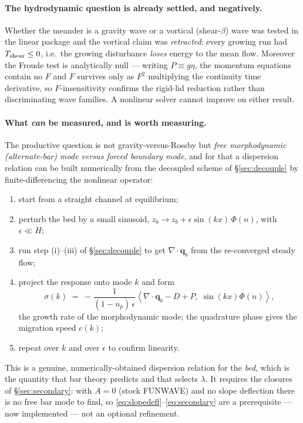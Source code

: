 \documentclass[11pt,a4paper]{article}
\begin{document}
\paragraph{The hydrodynamic question is already settled, and negatively.} Whether the
meander is a gravity wave or a vortical (shear-$\beta$) wave was tested in the linear
package and the vortical claim was \emph{retracted}: every growing run had
$T_{\rm shear}\le0$, i.e.\ the growing disturbance \emph{loses} energy to the mean flow.
Moreover the Froude test is analytically null --- writing $P\equiv g\eta$, the momentum
equations contain no $F$ and $F$ survives only as $F^2$ multiplying the continuity time
derivative, so $F$-insensitivity confirms the rigid-lid reduction rather than
discriminating wave families. A nonlinear solver cannot improve on either result.

\paragraph{What \emph{can} be measured, and is worth measuring.} The productive question
is not gravity-versus-Rossby but \emph{free morphodynamic (alternate-bar) mode versus
forced boundary mode}, and for that a dispersion relation can be built numerically from
the decoupled scheme of \S\ref{sec:decouple} by finite-differencing the nonlinear operator:
\begin{enumerate}\itemsep1pt
  \item start from a straight channel at equilibrium;
  \item perturb the bed by a small sinusoid,
        $z_b\to z_b+\epsilon\sin(kx)\,\Phi(n)$, with $\epsilon\ll H$;
  \item run step (i)--(iii) of \S\ref{sec:decouple} to get $\nabla\!\cdot\!\bm q_b$ from
        the re-converged steady flow;
  \item project the response onto mode $k$ and form
        \begin{equation}
          \sigma(k) \;=\; -\frac{1}{(1-n_p)\,\epsilon}
          \left\langle \nabla\!\cdot\!\bm q_b - D + P,\; \sin(kx)\Phi(n)\right\rangle ,
        \end{equation}
        the growth rate of the morphodynamic mode; the quadrature phase gives the
        migration speed $c(k)$;
  \item repeat over $k$ and over $\epsilon$ to confirm linearity.
\end{enumerate}
This is a genuine, numerically-obtained dispersion relation for the \emph{bed}, which is
the quantity that bar theory predicts and that selects $\lambda$. It requires the closures
of \S\ref{sec:secondary}: with $A=0$ (stock FUNWAVE) and no slope deflection there is no free
bar mode to find, so \eqref{eq:slopedefl}--\eqref{eq:secondary} are a prerequisite --- now
implemented --- not an optional refinement.
\end{document}
